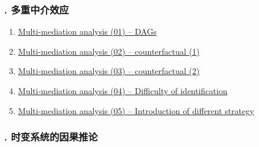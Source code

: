 \documentclass[11pt]{article}
\begin{document}
\vspace{-1cm}

\subsubsection*{. 多重中介效应}

\vspace{-0.5cm}

\begin{enumerate}
	\item \href{https://mp.weixin.qq.com/s/6-TvJrRUcluUYCzGwgluKA}{Multi-mediation analysis (01) – DAGs}	%
	\item \href{https://mp.weixin.qq.com/s/RMfV5z9WIxsswops8HLKng}{Multi-mediation analysis (02) – counterfactual (1)}	%
	\item \href{https://mp.weixin.qq.com/s/EKEqsaAx_RmQDJlFy9vsmw}{Multi-mediation analysis (03) – counterfactual (2)}	%
	\item \href{https://mp.weixin.qq.com/s/5k5HY6pT6tnrAW4gFVRVKw}{Multi-mediation analysis (04) – Difficulty of identification}	%
	\item \href{https://mp.weixin.qq.com/s/n-mpLQk9pysPWUrSz26TVg}{Multi-mediation analysis (05) – Introduction of different strategy}	%
\end{enumerate}

\vspace{-1cm}

\subsubsection*{. 时变系统的因果推论}

\vspace{-0.5cm}
\end{document}
